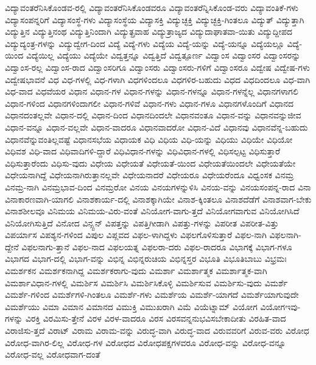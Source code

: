 {ವಿದ್ಯಾವಂತರೆನಿಸಿಕೊಂಡವ-ರಲ್ಲಿ
ವಿದ್ಯಾವಂತರೆನಿಸಿಕೊಂಡವರೂ
ವಿದ್ಯಾವಂತರೆನ್ನಿಸಿಕೊಂಡ-ವರು
ವಿದ್ಯಾವಂತಿಕೆ-ಗಳು
ವಿದ್ಯಾಸಂಪನ್ನರಿಗೆ
ವಿದ್ಯಾಸಂಸ್ಥೆ-ಗಳು
ವಿದ್ಯಾಸಂಸ್ಥೆಯ
ವಿದ್ಯಾಸಕ್ತಿ
ವಿದ್ಯುಚ್ಛಕ್ತಿ
ವಿದ್ಯುಚ್ಛಕ್ತಿ-ಗಿಂತಲೂ
ವಿದ್ಯುತ್
ವಿದ್ಯುತ್ತಾಗಿ
ವಿದ್ಯುತ್ತಿನ
ವಿದ್ಯುತ್ತಿನಂಥ
ವಿದ್ಯುತ್ತಿನಿಂದಾಗಿ
ವಿದ್ಯುತ್ಪ್ರವಾಹ
ವಿದ್ಯುತ್ರಾಜ್ಯದ
ವಿದ್ಯುದಾಘಾತವಾ-ಯಿತು
ವಿದ್ಯುದ್ದೀಪದ
ವಿದ್ಯುದ್ಯಂತ್ರ-ಗಳನ್ನು
ವಿದ್ಯುದ್ವೇಗ-ದಿಂದ
ವಿದ್ಯೆ
ವಿದ್ಯೆ-ಗಳು
ವಿದ್ಯೆಯ
ವಿದ್ಯೆ-ಯನ್ನು
ವಿದ್ಯೆ-ಯನ್ನೂ
ವಿದ್ಯೆಯಲ್ಲೂ
ವಿದ್ಯೆ-ಯಿಂದ
ವಿದ್ಯೆಯಿಲ್ಲ
ವಿದ್ಯೆಯು
ವಿದ್ಯೆಯೇ
ವಿದ್ವತ್ತನ್ನೂ
ವಿದ್ವತ್ತಿದೆ
ವಿದ್ವತ್ಪೂರ್ಣ
ವಿದ್ವಾಂಸ
ವಿದ್ವಾಂಸರ
ವಿದ್ವಾಂಸರನ್ನು
ವಿದ್ವಾಂಸ-ರಲ್ಲ
ವಿದ್ವಾಂಸ-ರಾದ
ವಿದ್ವಾಂಸರಿಗೂ
ವಿದ್ವಾಂಸರು
ವಿದ್ವಾಂಸರು-ಗಳಿಗೆ
ವಿದ್ವಾಂಸರೂ
ವಿದ್ವೇಷ
ವಿದ್ವೇಷ-ಗಳು
ವಿದ್ವೇಷಭಾವನೆ
ವಿಧ
ವಿಧ-ಗಳಲ್ಲಿ
ವಿಧ-ಗಳಾಗಿ
ವಿಧಗಳಿಂದಲೂ
ವಿಧಗಳಿರ-ಬಹುದು
ವಿಧದ
ವಿಧದಿಂದಲೂ
ವಿಧ-ವಾಗಿ
ವಿಧ-ವಾದ
ವಿಧವೆಯರ
ವಿಧಾನ
ವಿಧಾನ-ಗಳ
ವಿಧಾನ-ಗಳನ್ನು
ವಿಧಾನ-ಗಳನ್ನೂ
ವಿಧಾನ-ಗಳನ್ನೆಲ್ಲ
ವಿಧಾನಗಳಾಗಲಿ
ವಿಧಾನ-ಗಳಿಂದ
ವಿಧಾನಗಳಿಂದಾಗಲೀ
ವಿಧಾನ-ಗಳಿವೆ
ವಿಧಾನ-ಗಳು
ವಿಧಾನ-ಗಳೂ
ವಿಧಾನಗಳೊಂದಿಗೆ
ವಿಧಾನದ
ವಿಧಾನದಂತಲ್ಲವೇ
ವಿಧಾನ-ದಲ್ಲಿ
ವಿಧಾನ-ದಿಂದ
ವಿಧಾನದಿಂದಲೇ
ವಿಧಾನವಂತೂ
ವಿಧಾನ-ವನ್ನು
ವಿಧಾನವನ್ನುಜೀವ
ವಿಧಾನ-ವನ್ನೂ
ವಿಧಾನ-ವಲ್ಲವೇ
ವಿಧಾನ-ವಾದರೂ
ವಿಧಾನವಾದರೋ
ವಿಧಾನ-ವಿದೆ
ವಿಧಾನವು
ವಿಧಾನವೆನ್ನ-ಬಹುದು
ವಿಧಾನವೆನ್ನುವಂತಿಲ್ಲವಷ್ಟೆ
ವಿಧಾನಸಭೆಯ
ವಿಧಾಯಕ
ವಿಧಿ
ವಿಧಿಯ
ವಿಧಿ-ಯನ್ನು
ವಿಧಿಯು
ವಿಧಿಯೇ
ವಿಧಿಯೋ
ವಿಧಿವಶ
ವಿಧಿ-ವಾದ
ವಿಧಿವಾದಿಗಳಿ-ದ್ದಾರೆ
ವಿಧಿವಿಧಾನ-ಗಳನ್ನು
ವಿಧಿವಿಧಾನ-ಗಳಲ್ಲಿ
ವಿಧಿಸಲ್ಪಟ್ಟ
ವಿಧಿಸುತ್ತಾರೆ
ವಿಧಿಸುತ್ತಾರೆಂದು
ವಿಧಿಸು-ವುದು
ವಿಧೇಯ
ವಿಧೇಯತೆ
ವಿಧೇಯತೆ-ಯಿಂದ
ವಿಧೇಯತೆಯಿಂದಲೇ
ವಿಧೇಯತೆಯೇ
ವಿಧೇಯನಾಗಿದ್ದೆ
ವಿಧೇಯನಾಗಿರುತ್ತಾನಲ್ಲವೇ
ವಿಧೇಯನಾದರೆ
ವಿಧೇಯರೂ
ವಿಧೇಯರೆಂದೂ
ವಿಧ್ವಂಸಕ
ವಿನಮ್ರ
ವಿನಮ್ರ-ನಾಗಿ
ವಿನಮ್ರಭಾವ-ದಿಂದ
ವಿನಮ್ರರೋ
ವಿನಯ
ವಿನಯಗಳನ್ನುಳಿಸಿ
ವಿನಯ-ವನ್ನು
ವಿನಯಸಂಪನ್ನ-ರಾದ
ವಿನಾ
ವಿನಾಕಾರಣವಾಗಿ-ಯಾಗಲಿ
ವಿನಾಶಕಾರ್ಯ-ದಲ್ಲಿ
ವಿನಾಶಕ್ಕಾಗಿಯೇ
ವಿನಾಶ-ಕ್ಕಿಂತಲೂ
ವಿನಾಶದೆಡೆಗೆ
ವಿನಾಶವಾಗ-ಬೇಕು
ವಿನಾಶಶೀಲವೂ
ವಿನಿಮಯ
ವಿನಿಮಯ-ವಿರು-ವಂತೆ
ವಿನಿಯೋಗ-ವಾಗು-ತ್ತದೆ
ವಿನಿಯೋಗವಾಗುವ
ವಿನಿಯೋಗಿಸಿದೆ
ವಿನಿಯೋಗಿಸುತ್ತಿದೆ
ವಿನೋದ
ವಿನ್ಸ್ಟನ್
ವಿಪತ್ತನ್ನು
ವಿಪತ್ತಿಗೀಡಾಗಿ
ವಿಪತ್ತು-ಗಳನ್ನು
ವಿಪರೀತ
ವಿಪರೀತ-ವಿತ್ತು
ವಿಪರ್ಯಾಸ
ವಿಪಶ್ಯನ-ಗಳಿಂದ
ವಿಪುಲ
ವಿಪ್ಲವದ
ವಿಫಲ-ಳಾಗಿದ್ದಳು
ವಿಫಲಗೊಳಿಸುತ್ತಾರೆ
ವಿಫಲ-ನಾಗಿ
ವಿಫಲನಾಗಿ-ದ್ದೇನೆ
ವಿಫಲನಾಗು-ತ್ತಾನೆ
ವಿಫಲ-ನಾದ
ವಿಫಲಯತ್ನ
ವಿಫಲರಾ-ದರು
ವಿಫಲ-ರಾದರೂ
ವಿಭಾಗಕ್ಕೆ
ವಿಭಾಗ-ಗಳೂ
ವಿಭಾಗದ
ವಿಭಾಗ-ದಲ್ಲಿ
ವಿಭಾಗ-ವನ್ನು
ವಿಭಿನ್ನ
ವಿಭಿನ್ನರುಚಿಯ
ವಿಭಿನ್ನಸ್ತರ
ವಿಭೂತಿ
ವಿಭೂತಿಬಾಬು
ವಿಭ್ರಮಃ
ವಿಮರ್ಶಕನ
ವಿಮರ್ಶಕನಾಗಿದ್ದ
ವಿಮರ್ಶಕರಾಗು-ವುದು
ವಿಮರ್ಶಾ
ವಿಮರ್ಶಾತ್ಮಕ
ವಿಮರ್ಶಾತ್ಮಕ-ವಾಗಿ
ವಿಮರ್ಶಾವಿಧಾನ-ಗಳಲ್ಲಿ
ವಿಮರ್ಶಿಸ
ವಿಮರ್ಶಿಸಿ
ವಿಮರ್ಶಿಸಿಕೊಳ್ಳಿ
ವಿಮರ್ಶಿಸುವ
ವಿಮರ್ಶಿಸು-ವುದು
ವಿಮರ್ಶೆ
ವಿಮರ್ಶೆ-ಗಳಿಂದ
ವಿಮರ್ಶೆಗಳಿ-ಗಿಂತಲೂ
ವಿಮರ್ಶೆ-ಗಳು
ವಿಮರ್ಶೆಯ
ವಿಮರ್ಶೆ-ಯಾಗದೆ
ವಿಮರ್ಶೆಯಾಗುವುದೇ
ವಿಮರ್ಶೆಯು
ವಿಮಾ
ವಿಮಾನ
ವಿಮಾನದ
ವಿಮುಕ್ತಿ
ವಿಮುಖರಾಗಿ
ವಿಮೆ
ವಿಯೆಟ್ನಾಮ್
ವಿಯೋಗ
ವಿಯೋಗಇವು-ಗಳನ್ನು
ವಿರಕ್ತಿ
ವಿರಮಿಸು-ತ್ತೇನೆ
ವಿರಳ
ವಿರಳ-ವಾದರೂ
ವಿರಸ
ವಿರಸವನ್ನನುಭವಿಸಬೇಕಾದೀತು
ವಿರಹಿತ-ವಾದ
ವಿರಾಜಿಸು-ತ್ತದೆ
ವಿರಾಟ್
ವಿರಾಮ
ವಿರಾಮ-ವನ್ನು
ವಿರುದ್ಧ-ವಾಗಿ
ವಿರುದ್ಧ-ವಾದ
ವಿರುವವರಿಗೆ
ವಿರುವ-ವರು
ವಿರೋಧ
ವಿರೋಧ-ವಾಗಿರ-ಲಿಲ್ಲ
ವಿರೋಧ-ಗಳ
ವಿರೋಧದ
ವಿರೋಧಪಕ್ಷಗಳವರೂ
ವಿರೋಧ-ವನ್ನು
ವಿರೋಧ-ವನ್ನೂ
ವಿರೋಧ-ವಲ್ಲ
ವಿರೋಧವಾಗ-ದಂತೆ
}
